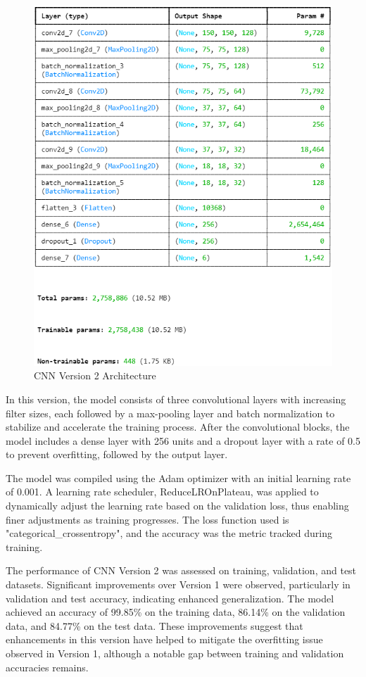 \documentclass[conference]{IEEEtran}
\begin{document}
\begin{figure}[H]
    \centering
    \includegraphics[width=0.75\linewidth]
    {images/cnn_arch_2.png}
    \caption{CNN Version 2 Architecture}
    \label{fig:cnnArch2}
\end{figure}

In this version, the model consists of three convolutional layers with increasing filter sizes, each followed by a max-pooling layer and batch normalization to stabilize and accelerate the training process. After the convolutional blocks, the model includes a dense layer with 256 units and a dropout layer with a rate of 0.5 to prevent overfitting, followed by the output layer.

The model was compiled using the Adam optimizer with an initial learning rate of 0.001. A learning rate scheduler, ReduceLROnPlateau, was applied to dynamically adjust the learning rate based on the validation loss, thus enabling finer adjustments as training progresses. The loss function used is "categorical\_crossentropy", and the accuracy was the metric tracked during training.

The performance of CNN Version 2 was assessed on training, validation, and test datasets. Significant improvements over Version 1 were observed, particularly in validation and test accuracy, indicating enhanced generalization. The model achieved an accuracy of 99.85\% on the training data, 86.14\% on the validation data, and 84.77\% on the test data. These improvements suggest that enhancements in this version have helped to mitigate the overfitting issue observed in Version 1, although a notable gap between training and validation accuracies remains.
\end{document}
